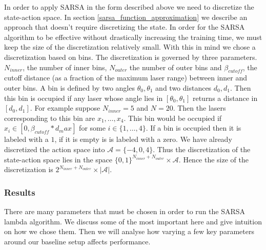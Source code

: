 \documentclass{article}
\begin{document}
In order to apply SARSA in the form described above we need to discretize the state-action space. In section \ref{sarsa_function_approximation} we describe an approach that doesn't require discretizing the state. In order for the SARSA algorithm to be effective without drastically increasing the training time, we must keep the size of the discretization relatively small. With this in mind we chose a discretization based on bins. The discretization is governed by three parameters. $N_{inner}$, the number of inner bins, $N_{outer}$ the number of outer bins and $\beta_{cutoff}$, the cutoff distance (as a fraction of the maximum laser range) between inner and outer bins. A bin is defined by two angles $\theta_0, \theta_1$ and two distances $d_0, d_1$. Then this bin is occupied if any laser whose angle lies in $[\theta_0,\theta_1]$ returns a distance in $[d_0,d_1]$. For example suppose $N_{inner} = 5$ and $N = 20$. Then the lasers corresponding to this bin are $x_1,\ldots,x_4$. This bin would be occupied if $x_i \in [0, \beta_{cutoff}*d_max]$ for some $i \in \{1,\ldots,4\}$. If a bin is occupied then it is labeled with a $1$, if it is empty is is labeled with a zero. We have already discretized the action space into $\mathcal{A} = \{-4,0,4\}$. Thus the discretization of the state-action space lies in the space $\{0,1\}^{N_{inner} + N_{outer}} \times \mathcal{A}$. Hence the size of the discretization is $2^{N_{inner} + N_{outer}} \times |\mathcal{A}|$.



\subsubsection{Results}

There are many parameters that must be chosen in order to run the SARSA lambda algorithm. We discuss some of the most important here and give intuition on how we chose them. Then we will analyse how varying a few key parameters around our baseline setup affects performance. 
\end{document}
